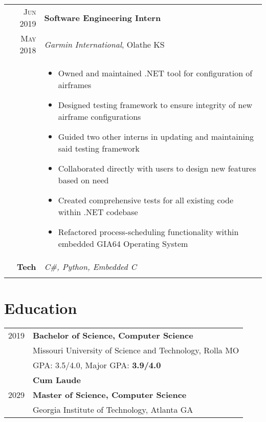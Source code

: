 \documentclass[a4paper,10pt]{article}
\newcommand{\br}{\\\multicolumn{2}{c}{}}
\begin{document}
\begin{tabular}{r|p{15cm}}
  \textsc{Jun 2019} & \textbf{Software Engineering Intern} \\
  \textsc{May 2018} & \textit{Garmin International}, Olathe KS
  \\ &
       \begin{itemize}
       \item Owned and maintained .NET tool for configuration of airframes
       \item Designed testing framework to ensure integrity of new airframe configurations
       \item Guided two other interns in updating and maintaining said testing framework
       \item Collaborated directly with users to design new features based on need
       \item Created comprehensive tests for all existing code within .NET codebase
       \item Refactored process-scheduling functionality within embedded GIA64 Operating System

       \end{itemize} \\
  \textbf{Tech} & \textit{C\#, Python, Embedded C} \br \\
\end{tabular}


\section{Education}
\begin{tabular}{r p{15cm}}
  \textsc{2019} & \textbf{Bachelor of Science, Computer Science} \\
                & Missouri University of Science and Technology, Rolla MO  \\
                & GPA: 3.5/4.0, Major GPA: \textbf{3.9/4.0} \\
                & \textbf{Cum Laude} \\
  \textsc{2029} & \textbf{Master of Science, Computer Science} \\
                & Georgia Institute of Technology, Atlanta GA
\end{tabular}
\end{document}
